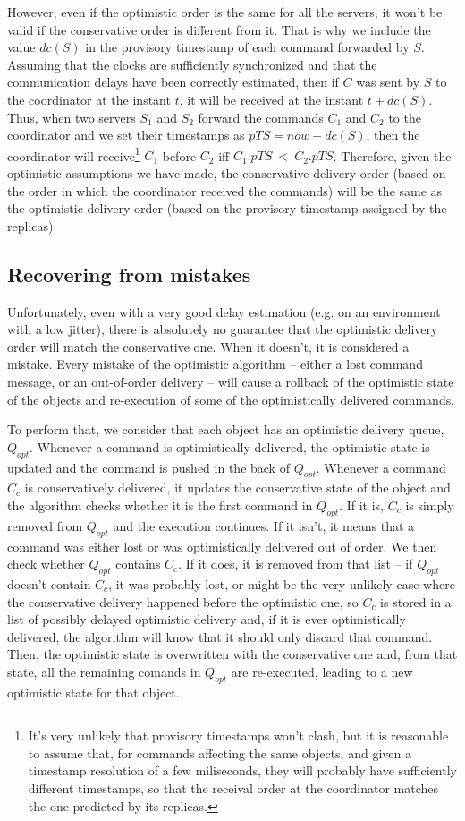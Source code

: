 \documentclass[times, 10pt]{article}
\begin{document}
However, even if the optimistic order is the same for all the servers, it won't be valid if the conservative order is different from it. That is why we include the value $dc(S)$ in the provisory timestamp of each command forwarded by $S$. Assuming that the clocks are sufficiently synchronized and that the communication delays have been correctly estimated, then if $C$ was sent by $S$ to the coordinator at the instant $t$, it will be received at the instant $t + dc(S)$. Thus, when two servers $S_1$ and $S_2$ forward the commands $C_1$ and $C_2$ to the coordinator and we set their timestamps as $pTS = now + dc(S)$, then the coordinator will receive\footnote{It's very unlikely that provisory timestamps won't clash, but it is reasonable to assume that, for commands affecting the same objects, and given a timestamp resolution of a few miliseconds, they will probably have sufficiently different timestamps, so that the receival order at the coordinator matches the one predicted by its replicas.} $C_1$ before $C_2$ iff $C_1.pTS~<~C_2.pTS$. Therefore, given the optimistic assumptions we have made, the conservative delivery order (based on the order in which the coordinator received the commands) will be the same as the optimistic delivery order (based on the provisory timestamp assigned by the replicas).

\subsection{Recovering from mistakes}

Unfortunately, even with a very good delay estimation (e.g. on an environment with a low jitter), there is absolutely no guarantee that the optimistic delivery order will match the conservative one. When it doesn't, it is considered a mistake. Every mistake of the optimistic algorithm -- either a lost command message, or an out-of-order delivery -- will cause a rollback of the optimistic state of the objects and re-execution of some of the optimistically delivered commands.

To perform that, we consider that each object has an optimistic delivery queue, $Q_{opt}$. Whenever a command is optimistically delivered, the optimistic state is updated and the command is pushed in the back of $Q_{opt}$. Whenever a command $C_c$ is conservatively delivered, it updates the conservative state of the object and the algorithm checks whether it is the first command in $Q_{opt}$. If it is, $C_c$ is simply removed from $Q_{opt}$ and the execution continues. If it isn't, it means that a command was either lost or was optimistically delivered out of order. We then check whether $Q_{opt}$ contains $C_c$. If it does, it is removed from that list -- if $Q_{opt}$ doesn't contain $C_c$, it was probably lost, or might be the very unlikely case where the conservative delivery happened before the optimistic one, so $C_c$ is stored in a list of possibly delayed optimistic delivery and, if it is ever optimistically delivered, the algorithm will know that it should only discard that command. Then, the optimistic state is overwritten with the conservative one and, from that state, all the remaining comands in $Q_{opt}$ are re-executed, leading to a new optimistic state for that object.


%
%
\end{document}
